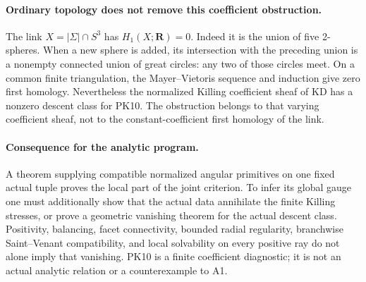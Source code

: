 \paragraph{Ordinary topology does not remove this coefficient obstruction.}
The link \(X=|\Sigma|\cap S^3\) has
\(H_1(X;\mathbf R)=0\).  Indeed it is the union of five
2-spheres.  When a new sphere is added, its intersection with
the preceding union is a nonempty connected union of great
circles: any two of those circles meet.  On a common finite
triangulation, the Mayer--Vietoris sequence and induction give
zero first homology.  Nevertheless the normalized Killing
coefficient sheaf of KD has a nonzero descent class for PK10.
The obstruction belongs to that varying coefficient sheaf,
not to the constant-coefficient first homology of the link.

\paragraph{Consequence for the analytic program.}
A theorem supplying compatible normalized angular primitives
on one fixed actual tuple proves the local part of the joint
criterion.  To infer its global gauge one must additionally
show that the actual data annihilate the finite Killing stresses,
or prove a geometric vanishing theorem for the actual descent
class.  Positivity, balancing, facet connectivity, bounded radial
regularity, branchwise Saint--Venant compatibility, and local
solvability on every positive ray do not alone imply that
vanishing.  PK10 is a finite coefficient diagnostic; it is not
an actual analytic relation or a counterexample to A1.
